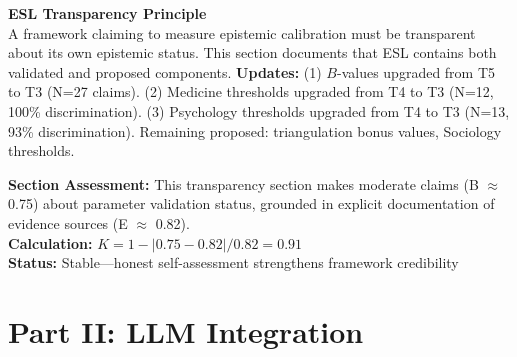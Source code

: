 \documentclass[11pt,a4paper]{article}
\begin{document}
\begin{insightbox}
\textbf{ESL Transparency Principle} \\
A framework claiming to measure epistemic calibration must be transparent about its own epistemic status. This section documents that ESL contains both validated and proposed components. \textbf{Updates:} (1) $B$-values upgraded from T5 to T3 (N=27 claims). (2) Medicine thresholds upgraded from T4 to T3 (N=12, 100\% discrimination). (3) Psychology thresholds upgraded from T4 to T3 (N=13, 93\% discrimination). Remaining proposed: triangulation bonus values, Sociology thresholds.
\end{insightbox}

\begin{eslbox}
\textbf{Section Assessment:} This transparency section makes moderate claims (B $\approx$ 0.75) about parameter validation status, grounded in explicit documentation of evidence sources (E $\approx$ 0.82). \\[0.3em]
\textbf{Calculation:} $K = 1 - |0.75 - 0.82| / 0.82 = 0.91$ \\
\textbf{Status:} \textcolor{green!60!black}{Stable}---honest self-assessment strengthens framework credibility
\end{eslbox}


\part*{Part II: LLM Integration}

\begin{center}
\end{center}
\end{document}
